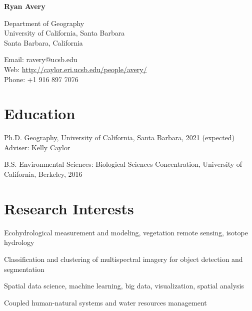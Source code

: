 \documentclass[12pt,letterpaper]{report}
\newcommand{\myname}{Ryan Avery}
\newcommand{\namefont}[1]{{\normalfont\bfseries\Huge{#1}}}
\newcommand{\listitemspace}{0.15em}
\renewenvironment{itemize}
{\begin{list}{}{\setlength{\leftmargin}{0em}
			\setlength{\parskip}{0em}
			\setlength{\itemsep}{\listitemspace}
			\setlength{\parsep}{\listitemspace}}}
	{\end{list}}
\begin{document}
	\raggedright
	
	\namefont{\myname}
	
	\vspace{1em}
	\begin{minipage}[t]{0.495\textwidth}
		Department of Geography \\
		University of California, Santa Barbara \\
		Santa Barbara, California
	\end{minipage}
	\begin{minipage}[t]{0.495\textwidth}
		Email: ravery@ucsb.edu \\
		Web: \href{http://caylor.eri.ucsb.edu/people/avery/}{http://caylor.eri.ucsb.edu/people/avery/} \\
		Phone: +1 916 897 7076
	\end{minipage}
	\vspace{0.5em}
	
	
	
	\section*{Education}
	
	\begin{tablist}
		
		\item[Ph.D.] \tab Geography, University of California, Santa Barbara, 2021 (expected) \\
		Adviser: Kelly Caylor 
		
		\item[B.S.]  \tab Environmental Sciences: Biological Sciences Concentration, University of California, Berkeley, 2016
		
	\end{tablist}	


	
	\section*{Research Interests}
	
	\begin{itemize}
		
		\item Ecohydrological measurement and modeling, vegetation remote sensing, isotope hydrology
		
		\item Classification and clustering of multispectral imagery for object detection and segmentation
		
		\item Spatial data science, machine learning, big data, visualization, spatial analysis
		
		\item Coupled human-natural systems and water resources management 
		
	\end{itemize}
	
\end{document}
